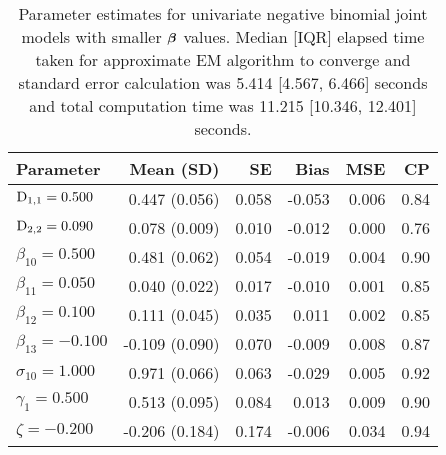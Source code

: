\begin{table}[ht]
\centering
{}
\captionsetup{font=scriptsize}
\begingroup\scriptsize
\begin{tabular}{l|rrrrr}
  Parameter & Mean (SD) & SE & Bias & MSE & CP \\ 
  \hline
  $\mathrm{D}_{1,1} = 0.500$ &  0.447 (0.056) & 0.058 & -0.053 & 0.006 & 0.84 \\ 
  $\mathrm{D}_{2,2} = 0.090$ &  0.078 (0.009) & 0.010 & -0.012 & 0.000 & 0.76 \\ 
  $\beta_{10} = 0.500$ &  0.481 (0.062) & 0.054 & -0.019 & 0.004 & 0.90 \\ 
  $\beta_{11} = 0.050$ &  0.040 (0.022) & 0.017 & -0.010 & 0.001 & 0.85 \\ 
  $\beta_{12} = 0.100$ &  0.111 (0.045) & 0.035 &  0.011 & 0.002 & 0.85 \\ 
  $\beta_{13} = -0.100$ & -0.109 (0.090) & 0.070 & -0.009 & 0.008 & 0.87 \\ 
  $\sigma_{10} = 1.000$ &  0.971 (0.066) & 0.063 & -0.029 & 0.005 & 0.92 \\ 
  $\gamma_1 = 0.500$ &  0.513 (0.095) & 0.084 &  0.013 & 0.009 & 0.90 \\ 
  $\zeta = -0.200$ & -0.206 (0.184) & 0.174 & -0.006 & 0.034 & 0.94 \\ 
   \hline
\end{tabular}
\endgroup
\caption{Parameter estimates for univariate negative binomial joint models with smaller $\bm{\beta}$ values. Median [IQR] elapsed time taken for approximate EM algorithm to converge and standard error calculation was 5.414 [4.567, 6.466] seconds and total computation time was 11.215 [10.346, 12.401] seconds.} 
\label{tab:appendix-GMVJM-univs-NB2}
\end{table}
\clearpage
\thispagestyle{empty}
